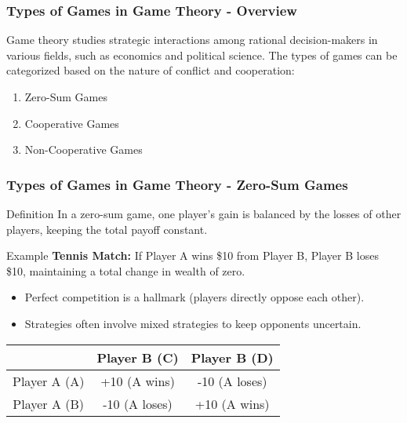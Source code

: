 \documentclass[aspectratio=169]{beamer}
\begin{document}
\begin{frame}[fragile]
    \frametitle{Types of Games in Game Theory - Overview}
    Game theory studies strategic interactions among rational decision-makers in various fields, such as economics and political science. The types of games can be categorized based on the nature of conflict and cooperation:
    
    \begin{enumerate}
        \item Zero-Sum Games
        \item Cooperative Games
        \item Non-Cooperative Games
    \end{enumerate}
\end{frame}

\begin{frame}[fragile]
    \frametitle{Types of Games in Game Theory - Zero-Sum Games}
    \begin{block}{Definition}
        In a zero-sum game, one player's gain is balanced by the losses of other players, keeping the total payoff constant.
    \end{block}
    
    \begin{exampleblock}{Example}
        \textbf{Tennis Match:} If Player A wins \$10 from Player B, Player B loses \$10, maintaining a total change in wealth of zero.
    \end{exampleblock}
    
    \begin{itemize}
        \item Perfect competition is a hallmark (players directly oppose each other).
        \item Strategies often involve mixed strategies to keep opponents uncertain.
    \end{itemize}

    \begin{table}[H]
        \centering
        \begin{tabular}{|c|c|c|}
            \hline
            & Player B (C) & Player B (D) \\
            \hline
            Player A (A) & +10 (A wins) & -10 (A loses) \\
            \hline
            Player A (B) & -10 (A loses) & +10 (A wins) \\
            \hline
        \end{tabular}
    \end{table}
\end{frame}
\end{document}
